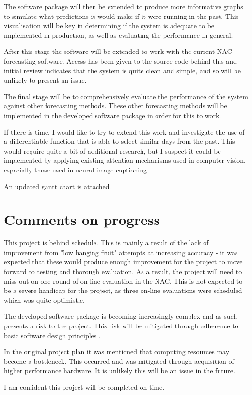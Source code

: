 The software package will then be extended to produce more informative graphs to simulate what predictions it would make if it were running in the past.
This visualisation will be key in determining if the system is adequate to be implemented in production, as well as evaluating the performance in general.

After this stage the software will be extended to work with the current NAC forecasting software. 
Access has been given to the source code behind this and initial review indicates that the system is quite clean and simple, and so will be unlikely to present an issue.

The final stage will be to comprehensively evaluate the performance of the system against other forecasting methods.
These other forecasting methods will be implemented in the developed software package in order for this to work.

If there is time, I would like to try to extend this work and investigate the use of a differentiable function that is able to select similar days from the past.
This would require quite a bit of additional research, but I suspect it could be implemented by applying existing attention mechanisms used in computer vision, especially those used in neural image captioning.

An updated gantt chart is attached.


\section{Comments on progress}
This project is behind schedule.
This is mainly a result of the lack of improvement from "low hanging fruit" attempts at increasing accuracy - it was expected that these would produce enough improvement for the project to move forward to testing and thorough evaluation.
As a result, the project will need to miss out on one round of on-line evaluation in the NAC.
This is not expected to be a severe handicap for the project, as three on-line evaluations were scheduled which was quite optimistic.

The developed software package is becoming increasingly complex and as such presents a risk to the project.
This risk will be mitigated through adherence to basic software design principles \citep{Haoyu2012}.

In the original project plan it was mentioned that computing resources may become a bottleneck.
This occurred and was mitigated through acquisition of higher performance hardware.
It is unlikely this will be an issue in the future.

I am confident this project will be completed on time.


